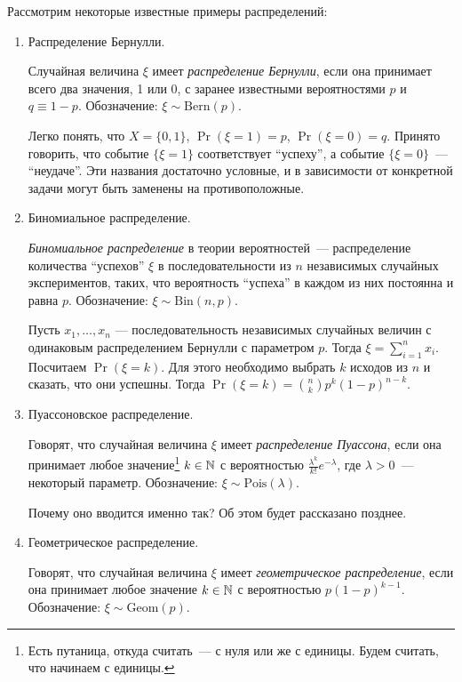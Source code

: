 Рассмотрим некоторые известные примеры распределений:
\begin{enumerate}
    \item Распределение Бернулли.
    \begin{definition}
        Случайная величина \(\xi\) имеет \emph{распределение Бернулли}, если она принимает всего два значения, 1 или 0, с заранее известными вероятностями \(p\) и \(q \equiv 1 - p\). Обозначение: \(\xi \sim \mathrm{Bern}(p)\).
    \end{definition}
    Легко понять, что \(X = \{0, 1\}\), \(\Pr(\xi = 1) = p\), \(\Pr(\xi = 0) = q\). Принято говорить, что событие \(\{\xi = 1\}\) соответствует ``успеху'', а событие \(\{\xi = 0\}\)~--- ``неудаче''. Эти названия достаточно условные, и в зависимости от конкретной задачи могут быть заменены на противоположные.
    
    \item Биномиальное распределение.
    \begin{definition}
        \emph{Биномиальное распределение} в теории вероятностей~--- распределение количества ``успехов'' \(\xi\) в последовательности из \(n\) независимых случайных экспериментов, таких, что вероятность ``успеха'' в каждом из них постоянна и равна \(p\). Обозначение: \(\xi \sim \mathrm{Bin}(n, p)\).
    \end{definition}
    Пусть \(x_1, \ldots, x_n\) --- последовательность независимых случайных величин с одинаковым распределением Бернулли с параметром \(p\). Тогда \(\xi = \sum\limits_{i = 1}^{n} x_i\). Посчитаем \(\Pr(\xi = k)\). Для этого необходимо выбрать \(k\) исходов из \(n\) и сказать, что они успешны. Тогда \(\Pr(\xi = k) = \binom{n}{k}p^k(1 - p)^{n - k}\). 
    
    \item Пуассоновское распределение. 
    \begin{definition}
        Говорят, что случайная величина \(\xi\) имеет \emph{распределение Пуассона}, если она принимает любое значение\footnote{Есть путаница, откуда считать~--- с нуля или же с единицы. Будем считать, что начинаем с единицы.} \(k \in \mathbb{N}\) с вероятностью \(\frac{\lambda^k}{k!}e^{-\lambda}\), где \(\lambda > 0\)~--- некоторый параметр. Обозначение: \(\xi \sim \mathrm{Pois}(\lambda)\).
    \end{definition}
    Почему оно вводится именно так? Об этом будет рассказано позднее.
    
    \item Геометрическое распределение.
    \begin{definition}
        Говорят, что случайная величина \(\xi\) имеет \emph{геометрическое распределение}, если она принимает любое значение \(k \in \mathbb{N}\) с вероятностью \(p(1 - p)^{k - 1}\). Обозначение: \(\xi \sim \mathrm{Geom}(p)\).
    \end{definition}
\end{enumerate}

